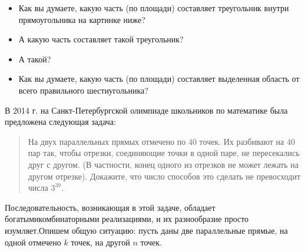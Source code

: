 ﻿

\begin{itemize}
\item Как вы думаете, какую часть (по площади) составляет треугольник внутри прямоугольника на картинке ниже?

\begin{center}  \end{center}


\item А какую часть составляет такой треугольник?

\begin{center}  \end{center}

\item А такой?

\begin{center}  \end{center}

\item Как вы думаете, какую часть (по площади) составляет выделенная область от всего правильного шестиугольника?

\begin{center}  \end{center}

\end{itemize}



В 2014 г. на Санкт-Петербургской олимпиаде школьников по математике была предложена следующая задача:
\begin{quote}
На двух параллельных прямых отмечено по 40 точек. Их разбивают на 40 пар так, чтобы отрезки, соединяющие точки в одной паре, не пересекались друг с другом. (В частности, конец одного из отрезков не может лежать на другом отрезке). Докажите, что число способов это сделать не превосходит числа $3^{39}$.
\end{quote}
Последовательность, возникающая в этой задаче, обладает богатыми\linebreak комбинаторными реализациями, и их разнообразие просто изумляет.\linebreak Опишем общую ситуацию: пусть даны две параллельные прямые, на одной отмечено $k$ точек, на другой $n$ точек. 

